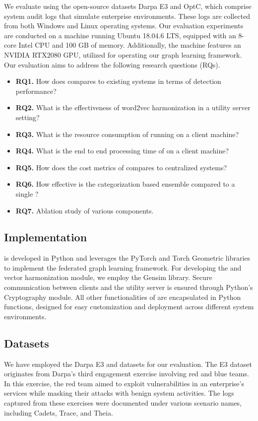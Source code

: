 We evaluate \Sys using the open-source datasets Darpa E3 and OptC, which comprise system audit logs that simulate enterprise environments. These logs are collected from both Windows and Linux operating systems. Our evaluation experiments are conducted on a machine running Ubuntu 18.04.6 LTS, equipped with an 8-core Intel CPU and 100 GB of memory. Additionally, the machine features an NVIDIA RTX2080 GPU, utilized for operating our graph learning framework. Our evaluation aims to address the following research questions (RQs).

\begin{itemize}[leftmargin=*]
\item \textbf{RQ1.} How does \Sys compares to existing systems in terms of detection performance?
\item \textbf{RQ2.} What is the effectiveness of word2vec harmonization in a utility server setting?
\item \textbf{RQ3.} What is the resource consumption of \Sys running on a client machine?
\item \textbf{RQ4.} What is the end to end processing time of \Sys on a client machine?
\item \textbf{RQ5.} How does the cost metrics of \Sys compares to centralized systems?
\item \textbf{RQ6.} How effective is the categorization based \gnnshort ensemble compared to a single \gnnshort?
\item \textbf{RQ7.} Ablation study of various \Sys components.
\end{itemize}

\subsection{Implementation}

\Sys is developed in Python and leverages the PyTorch and Torch Geometric libraries to implement the federated graph learning framework.  For developing the \wordvec and vector harmonization module, we employ the Gensim library. Secure communication between clients and the utility server is ensured through Python's Cryptography module. All other functionalities of \Sys are encapsulated in Python functions, designed for easy customization and deployment across different system environments.


\subsection{Datasets}
We have employed the Darpa E3 and \optc datasets for our evaluation. The E3 dataset originates from Darpa's third engagement exercise involving red and blue teams. In this exercise, the red team aimed to exploit vulnerabilities in an enterprise's services while masking their attacks with benign system activities. The logs captured from these exercises were documented under various scenario names, including Cadets, Trace, and Theia.

